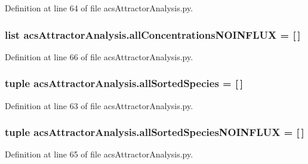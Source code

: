 Definition at line 64 of file acs\+Attractor\+Analysis.\+py.

\hypertarget{a00124_acda16f4751633455ab19e92bdc5baf2a}{
\subsubsection[{all\+Concentrations\+N\+O\+I\+N\+F\+L\+U\+X}]{\setlength{\rightskip}{0pt plus 5cm}list acs\+Attractor\+Analysis.\+all\+Concentrations\+N\+O\+I\+N\+F\+L\+U\+X = \mbox{[}$\,$\mbox{]}}}\label{a00124_acda16f4751633455ab19e92bdc5baf2a}


Definition at line 66 of file acs\+Attractor\+Analysis.\+py.

\hypertarget{a00124_aafc595063b7c4b74f94c0931ff2370a5}{
\subsubsection[{all\+Sorted\+Species}]{\setlength{\rightskip}{0pt plus 5cm}tuple acs\+Attractor\+Analysis.\+all\+Sorted\+Species = \mbox{[}$\,$\mbox{]}}}\label{a00124_aafc595063b7c4b74f94c0931ff2370a5}


Definition at line 63 of file acs\+Attractor\+Analysis.\+py.

\hypertarget{a00124_a02a8db664a67956bc698b79f7c31a7bd}{
\subsubsection[{all\+Sorted\+Species\+N\+O\+I\+N\+F\+L\+U\+X}]{\setlength{\rightskip}{0pt plus 5cm}tuple acs\+Attractor\+Analysis.\+all\+Sorted\+Species\+N\+O\+I\+N\+F\+L\+U\+X = \mbox{[}$\,$\mbox{]}}}\label{a00124_a02a8db664a67956bc698b79f7c31a7bd}


Definition at line 65 of file acs\+Attractor\+Analysis.\+py.

